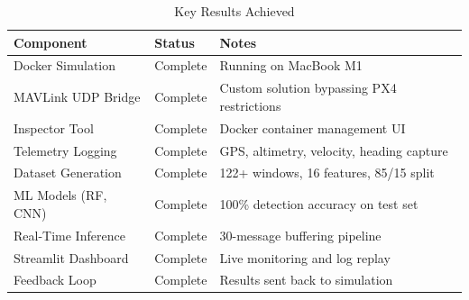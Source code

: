 \begin{table}[htbp]
    \centering
    \caption{Key Results Achieved}
    \label{tab:results}
    \begin{tabular}{|l|l|l|}
        \hline
        \textbf{Component} & \textbf{Status} & \textbf{Notes} \\
        \hline
        Docker Simulation & Complete & Running on MacBook M1 \\
        \hline
        MAVLink UDP Bridge & Complete & Custom solution bypassing PX4 restrictions \\
        \hline
        Inspector Tool & Complete & Docker container management UI \\
        \hline
        Telemetry Logging & Complete & GPS, altimetry, velocity, heading capture \\
        \hline
        Dataset Generation & Complete & 122+ windows, 16 features, 85/15 split \\
        \hline
        ML Models (RF, CNN) & Complete & 100\% detection accuracy on test set \\
        \hline
        Real-Time Inference & Complete & 30-message buffering pipeline \\
        \hline
        Streamlit Dashboard & Complete & Live monitoring and log replay \\
        \hline
        Feedback Loop & Complete & Results sent back to simulation \\
        \hline
    \end{tabular}
\end{table}